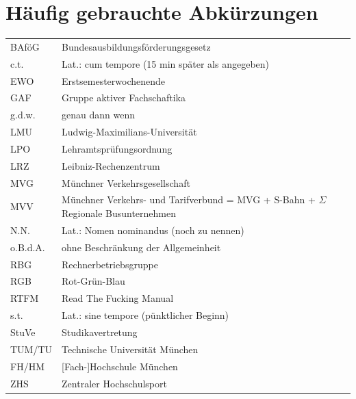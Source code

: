 \documentclass[twoside,12pt,parskip=half-]{scrartcl}
\begin{document}
\section[Abkürzungen]{Häufig gebrauchte Abkürzungen}
\begin{tabular}{l p{10cm}}
BAföG        &Bundesausbildungsförderungsgesetz\\
c.t.        &Lat.: cum tempore (15 min später als angegeben)\\
EWO        &Erstsemesterwochenende\\
GAF        &Gruppe aktiver Fachschaftika\\
g.d.w.    & genau dann wenn\\
LMU        &Ludwig-Maximilians-Universität\\
LPO        &Lehramtsprüfungsordnung\\
LRZ        &Leibniz-Rechenzentrum\\
MVG    &Münchner Verkehrsgesellschaft\\
MVV    &Münchner Verkehrs- und Tarifverbund = \newline MVG + S-Bahn + $\Sigma$ Regionale Busunternehmen\\
N.N.        &Lat.: Nomen nominandus (noch zu nennen)\\
o.B.d.A.    &ohne Beschränkung der Allgemeinheit\\
RBG        &Rechnerbetriebsgruppe\\
RGB             &Rot-Grün-Blau\\
RTFM        &Read The Fucking Manual\\
s.t.        &Lat.: sine tempore (pünktlicher Beginn)\\
StuVe           &Studikavertretung\\
TUM/TU        &Technische Universität München\\
FH/HM        &[Fach-]Hochschule München\\
ZHS        &Zentraler Hochschulsport\\
\end{tabular}




\clearpage
\end{document}
